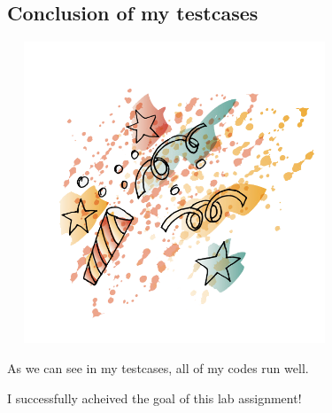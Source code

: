 \documentclass{article}
\begin{document}
\subsection*{Conclusion of my testcases}
	\includegraphics[width = 10cm, height = 9cm]{happy.png}
\begin{description}
	\item As we can see in my testcases, all of my codes run well.
	\item I successfully acheived the goal of this lab assignment!
\end{description}
\end{document}
